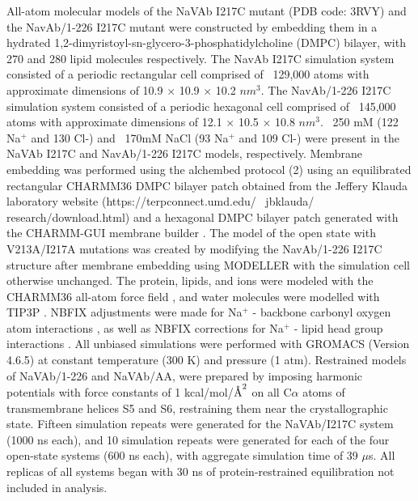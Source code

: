 \begin{refsection}
{%

All-atom molecular models of the NaVAb I217C mutant (PDB code: 3RVY) \cite{Payandeh:2012ib} and the NavAb/1-226 I217C mutant were constructed by embedding them in a hydrated 1,2-dimyristoyl-sn-glycero-3-phosphatidylcholine (DMPC) bilayer, with 270 and 280 lipid molecules respectively. The NavAb I217C simulation system consisted of a periodic rectangular cell comprised of ~129,000 atoms with approximate dimensions of 10.9 $\times$ 10.9 $\times$ 10.2 $nm^{3}$. The NavAb/1-226 I217C simulation system consisted of a periodic hexagonal cell comprised of ~145,000 atoms with approximate dimensions of 12.1 $\times$ 10.5 $\times$ 10.8 $nm^{3}$. ~250 mM (122 Na$^+$ and 130 Cl-) and ~170mM NaCl (93 Na$^+$ and 109 Cl-) were present in the NaVAb I217C and NavAb/1-226 I217C models, respectively. Membrane embedding was performed using the alchembed protocol (2) using an equilibrated rectangular CHARMM36 DMPC bilayer patch obtained from the Jeffery Klauda laboratory website (https://terpconnect.umd.edu/ ~jbklauda/ research/download.html) and a hexagonal DMPC bilayer patch generated with the CHARMM-GUI membrane builder \cite{Wu:2014uc}. The model of the open state with V213A/I217A mutations was created by modifying the NavAb/1-226 I217C structure after membrane embedding using MODELLER \cite{Fiser:2003we} with the simulation cell otherwise unchanged. The protein, lipids, and ions were modeled with the CHARMM36 all-atom force field \cite{Best:2012uu,MacKerell:1998tp,Klauda:2010tn}, and water molecules were modelled with TIP3P \cite{Jorgensen:1983ty}. NBFIX adjustments were made for Na$^+$ - backbone carbonyl oxygen atom interactions \cite{Noskov:2008jp}, as well as NBFIX corrections for Na$^+$ - lipid head group interactions \cite{Venable:2013ix}. 
All unbiased simulations were performed with GROMACS (Version 4.6.5) \cite{Pronk:2013ef} at constant temperature (300 K) and pressure (1 atm). Restrained models of NaVAb/1-226 and NaVAb/AA, were prepared by imposing harmonic potentials with force constants of 1 kcal/mol/$\textup{\AA}^{2}$ on all C$\alpha$ atoms of transmembrane helices S5 and S6, restraining them near the crystallographic state. Fifteen simulation repeats were generated for the NaVAb/I217C system (1000 ns each), and 10 simulation repeats were generated for each of the four open-state systems (600 ns each), with aggregate simulation time of 39 $\mu$s. All replicas of all systems began with 30 ns of protein-restrained equilibration not included in analysis.
}
\end{refsection}
